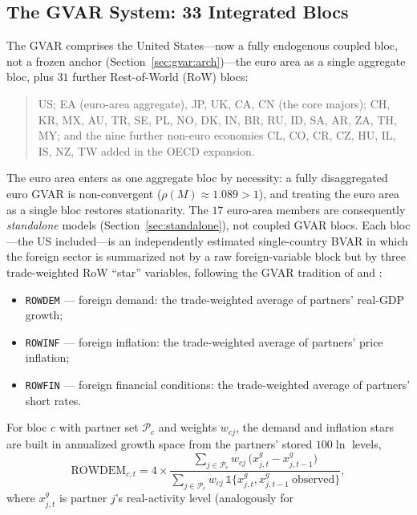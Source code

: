 \documentclass[11pt]{article}
\theoremstyle{definition}
\theoremstyle{remark}
\begin{document}
\subsection{The GVAR System: 33 Integrated Blocs}\label{sec:gvar-roster}

The GVAR comprises the United States---now a fully endogenous coupled bloc, not a
frozen anchor (Section~\ref{sec:gvar:arch})---the euro area as a single aggregate
bloc, plus $31$ further Rest-of-World (RoW) blocs:
\begin{quote}
US; EA (euro-area aggregate), JP, UK, CA, CN (the core majors); CH, KR,
MX, AU, TR, SE, PL, NO, DK, IN, BR, RU, ID, SA, AR, ZA, TH, MY; and the nine
further non-euro economies CL, CO, CR, CZ, HU, IL, IS, NZ, TW added in the OECD
expansion.
\end{quote}
The euro area enters as one aggregate bloc by necessity: a fully disaggregated
euro GVAR is non-convergent ($\rho(M)\approx 1.089 > 1$), and treating the euro
area as a single bloc restores stationarity. The $17$
euro-area members are consequently \emph{standalone} models
(Section~\ref{sec:standalone}), not coupled GVAR blocs.
Each bloc---the US included---is an independently estimated single-country BVAR
in which the foreign sector is summarized not by a raw foreign-variable
block but by three trade-weighted RoW ``star'' variables, following the
GVAR tradition of \citet{PesaranSchuermannWeiner2004} and
\citet{DeesDiMauroPesaranSmith2007}:
\begin{itemize}
  \item \texttt{ROWDEM} --- foreign demand: the trade-weighted average
    of partners' real-GDP growth;
  \item \texttt{ROWINF} --- foreign inflation: the trade-weighted
    average of partners' price inflation;
  \item \texttt{ROWFIN} --- foreign financial conditions: the
    trade-weighted average of partners' short rates.
\end{itemize}
For bloc $c$ with partner set $\mathcal{P}_c$ and weights $w_{cj}$, the
demand and inflation stars are built in annualized growth space from the
partners' stored $100\ln$ levels,
\begin{equation}\label{eq:star}
  \mathrm{ROWDEM}_{c,t} = 4 \times
  \frac{\sum_{j\in\mathcal{P}_c} w_{cj}\,
        \bigl(x^{g}_{j,t} - x^{g}_{j,t-1}\bigr)}
       {\sum_{j\in\mathcal{P}_c} w_{cj}\,\mathbb{1}\{x^{g}_{j,t},x^{g}_{j,t-1}\ \text{observed}\}},
\end{equation}
where $x^{g}_{j,t}$ is partner $j$'s real-activity level (analogously for
\end{document}
